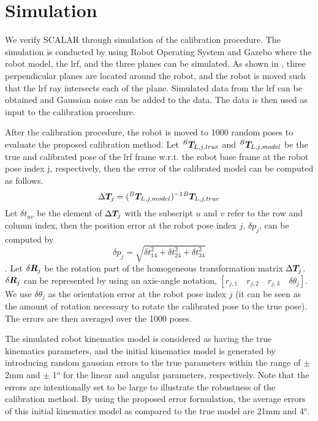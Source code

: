 \section{Simulation}
\label{sec:simulation}

We verify SCALAR through simulation of the calibration procedure. The simulation is conducted by using Robot Operating System and Gazebo where the robot model, the \ac{lrf}, and the three planes can be simulated.  
As shown in , three perpendicular planes are located around the robot, and the robot is moved such that the \ac{lrf} ray intersects each of the plane. Simulated data from the \ac{lrf} can be obtained and Gaussian noise can be added to the data. The data is then used as input to the calibration procedure. 

After the calibration procedure, the robot is moved to 1000 random poses to evaluate the proposed calibration method. Let ${^B}\vb*{T}_{L,j,true}$ and ${^B}\vb*{T}_{L,j,model}$ be the true and calibrated pose of the \ac{lrf} frame w.r.t. the robot base frame at the robot pose index j, respectively, then the error of the calibrated model can be computed as follows. 
\begin{equation}
\Delta \vb*{T}_j =  ({^B}\vb*{T}_{L,j,model})^{-1} {^B}\vb*{T}_{L,j,true}
\end{equation}
Let $\delta t_{uv}$ be the element of $\Delta \vb*{T}_j$ with the subscript $u$ and $v$ refer to the row and column index, then the position error at the robot pose index $j$, $\delta p_j$, can be computed by
\begin{equation}
\delta p_j = \sqrt{\delta t_{14}^2 + \delta t_{24}^2 + \delta t_{34}^2}
\end{equation}.
Let $\delta \vb*{R}_j$ be the rotation part of the homogeneous transformation matrix $\Delta \vb*{T}_j$. $\delta \vb*{R}_j$ can be represented by using an axis-angle notation, $[r_{j,1}\quad r_{j,2}\quad r_{j,3}\quad \delta \theta_j]$. We use $\delta\theta_j$ as the orientation error at the robot pose index $j$ (it can be seen as the amount of rotation necessary to rotate the calibrated pose to the true pose). The errors are then averaged over the 1000 poses. 

The simulated robot kinematics model is considered as having the true kinematics parameters, and the initial kinematics model is generated by introducing random gaussian errors to the true parameters within the range of $\pm$ 2mm and $\pm$ 1$^o$ for the linear and angular parameters, respectively. Note that the errors are intentionally set to be large to illustrate the robustness of the calibration method. By using the proposed error formulation, the average errors of this initial kinematics model as compared to the true model are 21mm and 4$^o$.


